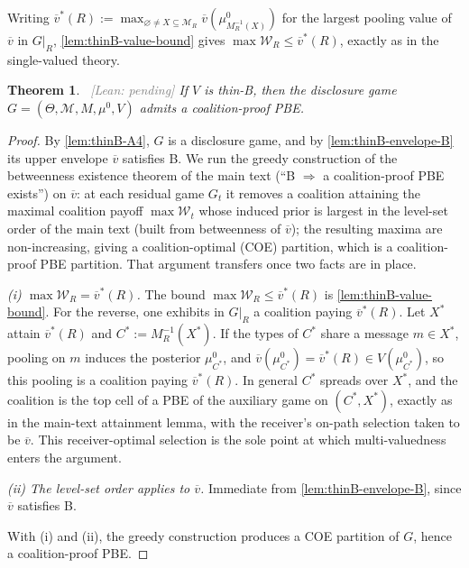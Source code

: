 \documentclass[11pt]{article}
\newtheorem{theorem}{Theorem}
\newcommand{\Msg}{\mathcal{M}}
\newcommand{\W}{\mathcal{W}}
\newcommand{\leanpending}{{\footnotesize\textsf{\textcolor{gray}{[Lean: pending]}}}}
\begin{document}
Writing $\overline v^*(R):=\max_{\varnothing\ne X\subseteq\Msg_R}
\overline v(\mu^0_{M^{-1}_R(X)})$ for the largest pooling value of $\overline v$
in $G\vert_R$, \cref{lem:thinB-value-bound} gives $\max\W_R\le\overline v^*(R)$,
exactly as in the single-valued theory.

\begin{theorem}\label{thm:thinB-cppbe}\ \leanpending
    If $V$ is thin-B, then the disclosure game $G=(\Theta,\Msg,M,\mu^0,V)$ admits
    a coalition-proof PBE.
\end{theorem}
\begin{proof}
    By \cref{lem:thinB-A4}, $G$ is a disclosure game, and by
    \cref{lem:thinB-envelope-B} its upper envelope $\overline v$ satisfies B. We
    run the greedy construction of the betweenness existence theorem of the main
    text (``B $\Rightarrow$ a coalition-proof PBE exists'') on $\overline v$: at
    each residual game $G_t$ it removes a coalition attaining the maximal
    coalition payoff $\max\W_t$ whose induced prior is largest in the level-set
    order of the main text (built from betweenness of $\overline v$); the
    resulting maxima are non-increasing, giving a coalition-optimal (COE)
    partition, which is a coalition-proof PBE partition. That argument transfers
    once two facts are in place.

    \emph{(i) $\max\W_R=\overline v^*(R)$.} The bound
    $\max\W_R\le\overline v^*(R)$ is \cref{lem:thinB-value-bound}. For the
    reverse, one exhibits in $G\vert_R$ a coalition paying $\overline v^*(R)$.
    Let $X^*$ attain $\overline v^*(R)$ and $C^*:=M^{-1}_R(X^*)$. If the types of
    $C^*$ share a message $m\in X^*$, pooling on $m$ induces the posterior
    $\mu^0_{C^*}$, and $\overline v(\mu^0_{C^*})=\overline v^*(R)\in V(\mu^0_{C^*})$,
    so this pooling is a coalition paying $\overline v^*(R)$. In general $C^*$
    spreads over $X^*$, and the coalition is the top cell of a PBE of the
    auxiliary game on $(C^*,X^*)$, exactly as in the main-text attainment lemma,
    with the receiver's on-path selection taken to be $\overline v$. This
    receiver-optimal selection is the sole point at which multi-valuedness enters
    the argument.

    \emph{(ii) The level-set order applies to $\overline v$.} Immediate from
    \cref{lem:thinB-envelope-B}, since $\overline v$ satisfies B.

    With (i) and (ii), the greedy construction produces a COE partition of $G$,
    hence a coalition-proof PBE.
\end{proof}
\end{document}

